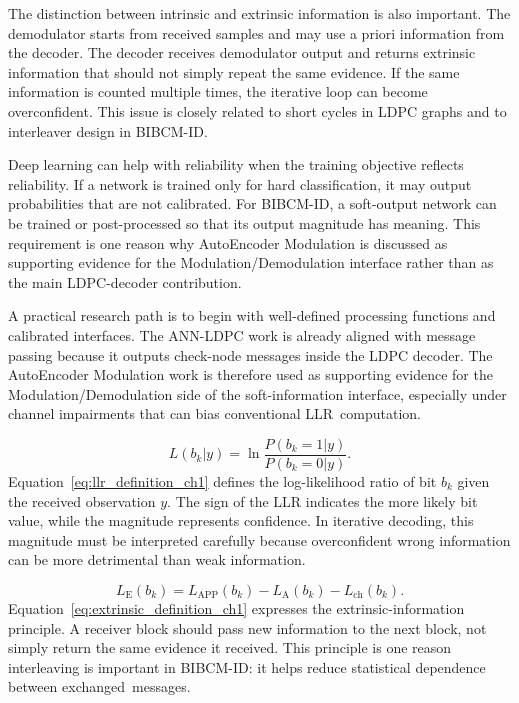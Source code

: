 The distinction between intrinsic and extrinsic information is also important. The demodulator starts from received samples and may use a priori information from the decoder. The decoder receives demodulator output and returns extrinsic information that should not simply repeat the same evidence. If the same information is counted multiple times, the iterative loop can become overconfident. This issue is closely related to short cycles in LDPC graphs and to interleaver design in BIBCM-ID.

Deep learning can help with reliability when the training objective reflects reliability. If a network is trained only for hard classification, it may output probabilities that are not calibrated. For BIBCM-ID, a soft-output network can be trained or post-processed so that its output magnitude has meaning. This requirement is one reason why AutoEncoder Modulation is discussed as supporting evidence for the Modulation/Demodulation interface rather than as the main LDPC-decoder contribution.

A practical research path is to begin with well-defined processing functions and calibrated interfaces. The ANN-LDPC work is already aligned with message passing because it outputs check-node messages inside the LDPC decoder. The AutoEncoder Modulation work is therefore used as supporting evidence for the Modulation/Demodulation side of the soft-information interface, especially under channel impairments that can bias conventional LLR~computation.

\begin{equation}
\label{eq:llr_definition_ch1}
L(b_k|y)=\ln\frac{P(b_k=1|y)}{P(b_k=0|y)}.
\end{equation}
Equation~\eqref{eq:llr_definition_ch1} defines the log-likelihood ratio of bit $b_k$ given the received observation $y$. The sign of the LLR indicates the more likely bit value, while the magnitude represents confidence. In iterative decoding, this magnitude must be interpreted carefully because overconfident wrong information can be more detrimental than weak information.

\begin{equation}
\label{eq:extrinsic_definition_ch1}
L_{\mathrm{E}}(b_k)=L_{\mathrm{APP}}(b_k)-L_{\mathrm{A}}(b_k)-L_{\mathrm{ch}}(b_k).
\end{equation}
Equation~\eqref{eq:extrinsic_definition_ch1} expresses the extrinsic-information principle. A receiver block should pass new information to the next block, not simply return the same evidence it received. This principle is one reason interleaving is important in BIBCM-ID: it helps reduce statistical dependence between exchanged~messages.

